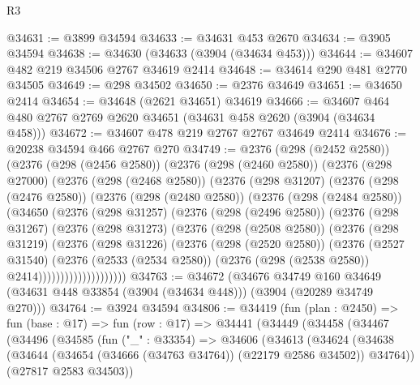 \begin{lexlean}{R3}
\begin{coremodule}
@34631 := @3899 @34594
@34633 := @34631 @453 @2670
@34634 := @3905 @34594
@34638 := @34630 (@34633 (@3904 (@34634 @453)))
@34644 := @34607 @482 @219 @34506 @2767 @34619 @2414
@34648 := @34614 @290 @481 @2770 @34505
@34649 := @298 @34502
@34650 := @2376 @34649
@34651 := @34650 @2414
@34654 := @34648 (@2621 @34651) @34619
@34666 := @34607 @464 @480 @2767 @2769 @2620 @34651 (@34631 @458 @2620 (@3904 (@34634 @458)))
@34672 := @34607 @478 @219 @2767 @2767 @34649 @2414
@34676 := @20238 @34594 @466 @2767 @270
@34749 := @2376
    (@298 (@2452 @2580))
    (@2376
      (@298 (@2456 @2580))
      (@2376
        (@298 (@2460 @2580))
        (@2376
          (@298 @27000)
          (@2376
            (@298 (@2468 @2580))
            (@2376
              (@298 @31207)
              (@2376
                (@298 (@2476 @2580))
                (@2376
                  (@298 (@2480 @2580))
                  (@2376
                    (@298 (@2484 @2580))
                    (@34650
                      (@2376
                        (@298 @31257)
                        (@2376
                          (@298 (@2496 @2580))
                          (@2376
                            (@298 @31267)
                            (@2376
                              (@298 @31273)
                              (@2376
                                (@298 (@2508 @2580))
                                (@2376
                                  (@298 @31219)
                                  (@2376
                                    (@298 @31226)
                                    (@2376
                                      (@298 (@2520 @2580))
                                      (@2376
                                        (@2527 @31540)
                                        (@2376
                                          (@2533 (@2534 @2580))
                                          (@2376 (@298 (@2538 @2580)) @2414))))))))))))))))))))
@34763 := @34672
    (@34676
      @34749
      @160
      @34649
      (@34631 @448 @33854 (@3904 (@34634 @448)))
      (@3904 (@20289 @34749 @270)))
@34764 := @3924 @34594
@34806 := @34419
    (fun (plan : @2450) =>
    fun (base : @17) =>
    fun (row : @17) =>
    @34441
      (@34449
        (@34458
          (@34467
            (@34496
              (@34585
                (fun ("_" : @33354) =>
                @34606
                  (@34613
                    (@34624
                      (@34638
                        (@34644 (@34654 (@34666 (@34763 @34764)) (@22179 @2586 @34502)) @34764))
                      (@27817 @2583 @34503))

\end{coremodule}
\end{lexlean}
